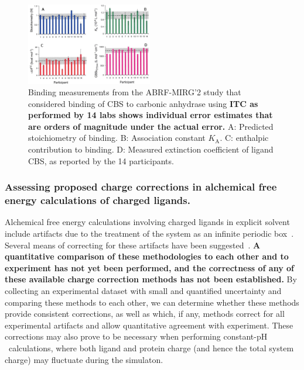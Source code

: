 \documentclass[10pt,final]{article}
\newcommand{\pH}{p$\mathrm{H}$\ }
\begin{document}
\begin{figure}[H]
	\centering
	\includegraphics[width=0.49\textwidth]{figures/cbs_ca_II.PNG}
	\caption{Binding measurements from the ABRF-MIRG'2 study that considered binding of CBS to carbonic anhydrase using \textbf{ITC as performed by 14 labs shows individual error estimates that are orders of magnitude under the actual error.} A: Predicted stoichiometry of binding. B: Association constant $K_\mathrm{A}$. C: enthalpic contribution to binding. D: Measured extinction coefficient of ligand CBS, as reported by the 14 participants.~\autocite{Myszka2003a}}
	\label{figure:abrf-mirg2}
\end{figure}

\subsubsection*{Assessing proposed charge corrections in alchemical free energy calculations of charged ligands.}
Alchemical free energy calculations involving charged ligands in explicit solvent include artifacts due to the treatment of the system as an infinite periodic box~\autocite{Rocklin2013b,Muddana2014a}. 
%
Several means of correcting for these artifacts have been suggested~\autocite{Reif2013a,Rocklin2013a,Lin2014a}.
%
\textbf{A quantitative comparison of these methodologies to each other and to experiment has not yet been performed, and the correctness of any of these available charge correction methods has not been established.}
%
By collecting an experimental dataset with small and quantified uncertainty and comparing these methods to each other, we can determine whether these methods provide consistent corrections, as well as which, if any, methods correct for all experimental artifacts and allow quantitative agreement with experiment.
%
These corrections may also prove to be necessary when performing constant-\pH calculations, where both ligand and protein charge (and hence the total system charge) may fluctuate during the simulaton.
\end{document}
